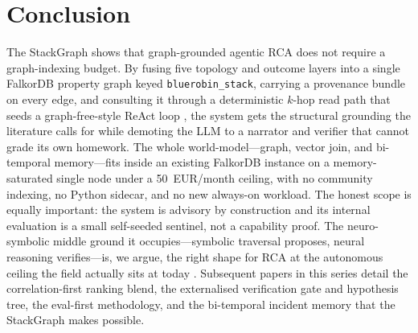 \documentclass[11pt]{article}
\begin{document}
\section{Conclusion}

The StackGraph shows that graph-grounded agentic RCA does not require a
graph-indexing budget. By fusing five topology and outcome layers into a single
FalkorDB property graph keyed \texttt{bluerobin\_stack}, carrying a provenance
bundle on every edge, and consulting it through a deterministic $k$-hop read path
that seeds a graph-free-style ReAct loop \citep{yao2022react}, the system gets
the structural grounding the literature calls for \citep{zhang2024survey} while
demoting the LLM to a narrator and verifier that cannot grade its own homework.
The whole world-model---graph, vector join, and bi-temporal memory---fits inside
an existing FalkorDB instance on a memory-saturated single node under a
50~EUR/month ceiling, with no community indexing, no Python sidecar, and no new
always-on workload. The honest scope is equally important: the system is advisory
by construction and its internal evaluation is a small self-seeded sentinel, not
a capability proof. The neuro-symbolic middle ground it occupies---symbolic
traversal proposes, neural reasoning verifies---is, we argue, the right shape for
RCA at the autonomous ceiling the field actually sits at today
\citep{xu2025openrca,itbenchaa2026}. Subsequent papers in this series detail the
correlation-first ranking blend, the externalised verification gate and
hypothesis tree, the eval-first methodology, and the bi-temporal incident memory
\citep{rasmussen2025zep} that the StackGraph makes possible.



\end{document}
